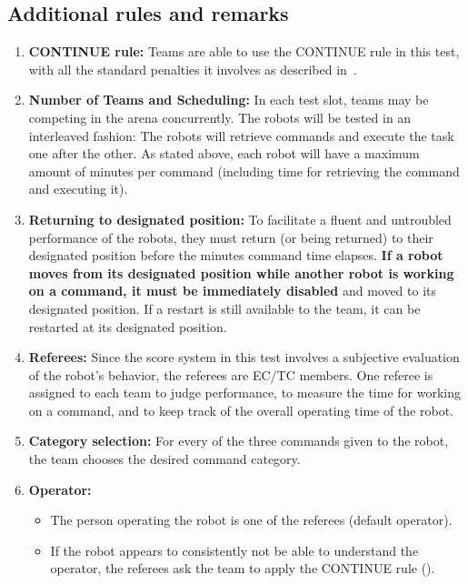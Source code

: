 \subsection{Additional rules and remarks}
\label{sec:eegpsr-remarks}
\begin{enumerate}
	\item \textbf{CONTINUE rule:} Teams are able to use the CONTINUE rule in this test, with all the standard penalties it involves as described in~.

	\item \textbf{Number of Teams and Scheduling:} In each test slot, \eegpsrTeams teams may be competing in the arena concurrently. The robots will be tested in an interleaved fashion: The robots will retrieve commands and execute the task one after the other. As stated above, each robot will have a maximum amount of \eegpsrMaxCmdTime minutes per command (including time for retrieving the command and executing it).

	\item \textbf{Returning to designated position:} To facilitate a fluent and untroubled performance of the robots, they must return (or being returned) to their designated position before the \eegpsrMaxCmdTime minutes command time elapses. \textbf{If a robot moves from its designated position while another robot is working on a command, it must be immediately disabled} and moved to its designated position. If a restart is still available to the team, it can be restarted at its designated position.

	\item \textbf{Referees:} Since the score system in this test involves a subjective evaluation of the robot's behavior, the referees are EC/TC members. One referee is assigned to each team to judge performance, to measure the time for working on a command, and to keep track of the overall operating time of the robot.

	\item \textbf{Category selection:} For every of the three commands given to the robot, the team chooses the desired command category.

	\item \textbf{Operator:}
	\begin{itemize}
		\item The person operating the robot is one of the referees (default operator).
		\item If the robot appears to consistently not be able to understand the operator, the referees ask the team to apply the CONTINUE rule ().
	\end{itemize}


\end{enumerate}
